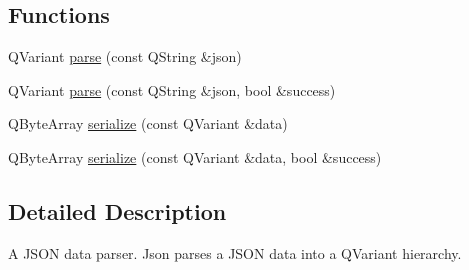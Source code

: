 \subsection*{Functions}
\begin{DoxyCompactItemize}
\item 
Q\-Variant \hyperlink{namespace_qt_json_ad92865ae39b2b148f6c788d7cf28c894}{parse} (const Q\-String \&json)
\item 
Q\-Variant \hyperlink{namespace_qt_json_ac4e31a9350b0df760c664c30f6e52162}{parse} (const Q\-String \&json, bool \&success)
\item 
Q\-Byte\-Array \hyperlink{namespace_qt_json_ace7d6102379674932334bea04fb15c12}{serialize} (const Q\-Variant \&data)
\item 
Q\-Byte\-Array \hyperlink{namespace_qt_json_a1ff5b8ee653a95a99a35ccff4c347a4c}{serialize} (const Q\-Variant \&data, bool \&success)
\end{DoxyCompactItemize}


\subsection{Detailed Description}
A J\-S\-O\-N data parser. Json parses a J\-S\-O\-N data into a Q\-Variant hierarchy. 

